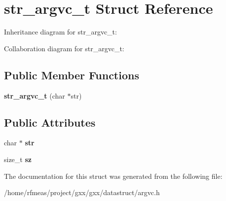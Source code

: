 \hypertarget{structstr__argvc__t}{}\section{str\+\_\+argvc\+\_\+t Struct Reference}
\label{structstr__argvc__t}


Inheritance diagram for str\+\_\+argvc\+\_\+t\+:


Collaboration diagram for str\+\_\+argvc\+\_\+t\+:
\subsection*{Public Member Functions}
\begin{DoxyCompactItemize}
\item 
{\bfseries str\+\_\+argvc\+\_\+t} (char $\ast$str)\hypertarget{structstr__argvc__t_a4ac94b1fb77ca02dfb4175d9f41f1bb6}{}\label{structstr__argvc__t_a4ac94b1fb77ca02dfb4175d9f41f1bb6}

\end{DoxyCompactItemize}
\subsection*{Public Attributes}
\begin{DoxyCompactItemize}
\item 
char $\ast$ {\bfseries str}\hypertarget{structstr__argvc__t_a29cff8e848371957525bba376b3afb71}{}\label{structstr__argvc__t_a29cff8e848371957525bba376b3afb71}

\item 
size\+\_\+t {\bfseries sz}\hypertarget{structstr__argvc__t_afcdcf87d4532d462fe3df4a5e0d0aa83}{}\label{structstr__argvc__t_afcdcf87d4532d462fe3df4a5e0d0aa83}

\end{DoxyCompactItemize}


The documentation for this struct was generated from the following file\+:\begin{DoxyCompactItemize}
\item 
/home/rfmeas/project/gxx/gxx/datastruct/argvc.\+h\end{DoxyCompactItemize}
